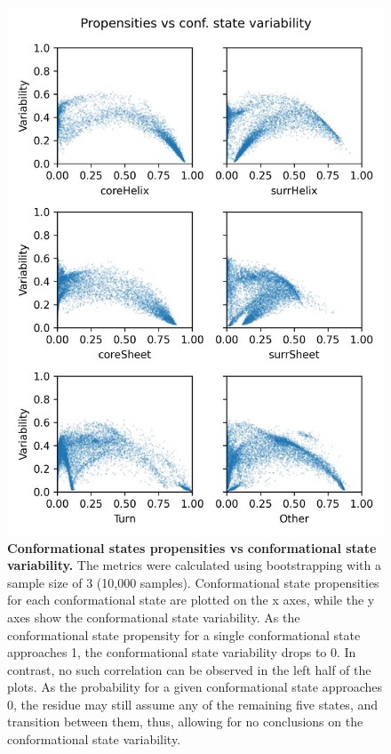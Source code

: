 \begin{figure}[H]
    \centering
    \includegraphics[width=0.8\linewidth]{constava//sup_figs/supfig13.pdf}
    \caption{\textbf{Conformational states propensities vs conformational state variability.} The metrics were calculated using bootstrapping with a sample size of 3 (10,000 samples). Conformational state propensities for each conformational state are plotted on the x axes, while the y axes show the conformational state variability. As the conformational state propensity for a single conformational state approaches 1, the conformational state variability drops to 0. In contrast, no such correlation can be observed in the left half of the plots. As the probability for a given conformational state approaches 0, the residue may still assume any of the remaining five states, and transition between them, thus, allowing for no conclusions on the conformational state variability.}
    \label{fig:sup_fig_constava:var_vs_propensity}
\end{figure}

